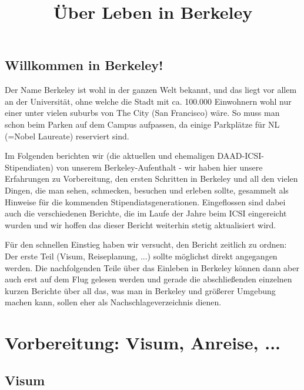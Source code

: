 \documentclass[a4paper]{scrreprt}
\begin{document}
\title{Über Leben in Berkeley}

\maketitle

\section*{Willkommen in Berkeley!}

Der Name Berkeley ist wohl in der ganzen Welt bekannt, und das liegt vor allem an der Universität, ohne welche die Stadt mit ca. 100.000 Einwohnern wohl nur einer unter vielen suburbs von The City (San Francisco) wäre. So muss man schon beim Parken auf dem Campus aufpassen, da einige Parkplätze für NL (=Nobel Laureate) reserviert sind.

Im Folgenden berichten wir (die aktuellen und ehemaligen DAAD-ICSI-Stipendiaten) von unserem Berkeley-Aufenthalt - wir haben hier unsere Erfahrungen zu Vorbereitung, den ersten Schritten in Berkeley und all den vielen Dingen, die man sehen, schmecken, besuchen und erleben sollte, gesammelt als Hinweise für die kommenden Stipendiatsgenerationen. Eingeflossen sind dabei auch die verschiedenen Berichte, die im Laufe der Jahre beim ICSI eingereicht wurden und wir hoffen das dieser Bericht weiterhin stetig aktualisiert wird.

Für den schnellen Einstieg haben wir versucht, den Bericht zeitlich zu ordnen: Der erste Teil (Visum, Reiseplanung, ...) sollte möglichst direkt angegangen werden. Die nachfolgenden Teile über das Einleben in Berkeley können dann aber auch erst auf dem Flug gelesen werden und gerade die abschließenden einzelnen kurzen Berichte über all das, was man in Berkeley und größerer Umgebung machen kann, sollen eher als Nachschlageverzeichnis dienen.


\tableofcontents
 
\chapter{Vorbereitung: Visum, Anreise, ...}

\section{Visum}
\end{document}
